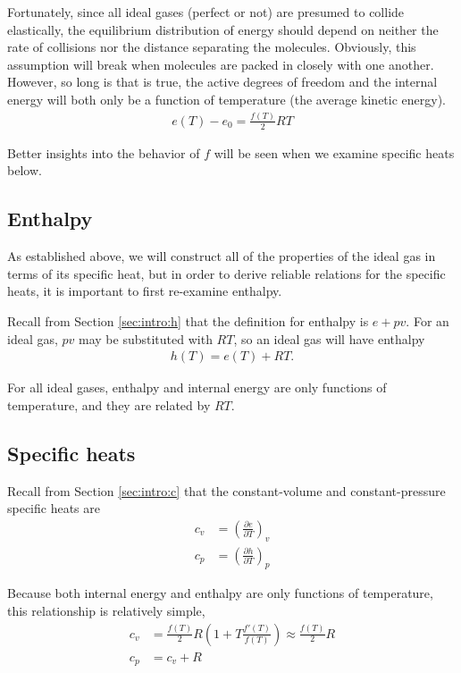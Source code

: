Fortunately, since all ideal gases (perfect or not) are presumed to collide elastically, the equilibrium distribution of energy should depend on neither the rate of collisions nor the distance separating the molecules.  Obviously, this assumption will break when molecules are packed in closely with one another.  However, so long is that is true, the active degrees of freedom and the internal energy will both only be a function of temperature (the average kinetic energy).
\begin{align}
e(T) - e_0 = \frac{f(T)}{2} R T \label{eqn:ig:efromt}
\end{align}

Better insights into the behavior of $f$ will be seen when we examine specific heats below.

\subsection{Enthalpy}\label{sec:ig:h}

As established above, we will construct all of the properties of the ideal gas in terms of its specific heat, but in order to derive reliable relations for the specific heats, it is important to first re-examine enthalpy.

Recall from Section \ref{sec:intro:h} that the definition for enthalpy is $e + pv$.  For an ideal gas, $pv$ may be substituted with $R T$, so an ideal gas will have enthalpy
\begin{align}
h(T) = e(T) + RT.\label{eqn:ig:hfrome}
\end{align}

For all ideal gases, enthalpy and internal energy are only functions of temperature, and they are related by $RT$.

\subsection{Specific heats}\label{sec:ig:c}

Recall from Section \ref{sec:intro:c} that the constant-volume and constant-pressure specific heats are
\begin{align}
c_v &= \left( \frac{\partial e}{\partial T} \right)_v\nonumber\\
c_p &= \left( \frac{\partial h}{\partial T} \right)_p\nonumber
\end{align}

Because both internal energy and enthalpy are only functions of temperature, this relationship is relatively simple,
\begin{align}
c_v &= \frac{f(T)}{2} R \left( 1 + T\frac{f'(T)}{f(T)}\right) \approx \frac{f(T)}{2} R \label{eqn:ig:cvfromt}\\
c_p &= c_v + R
\end{align}

